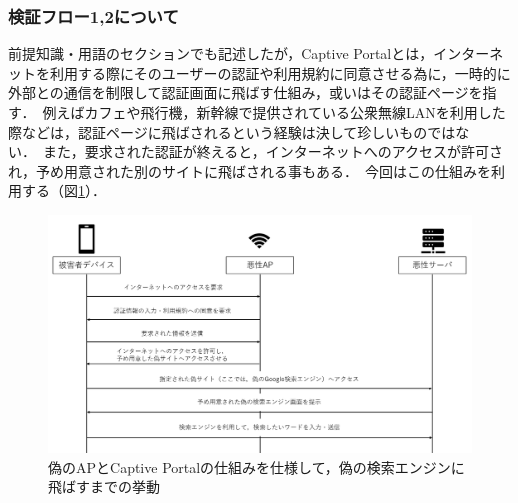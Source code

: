 \documentclass[dvipdfmx]{jsarticle}
\begin{document}
            \subsubsection{検証フロー1,2について}
                前提知識・用語のセクションでも記述したが，Captive Portalとは，インターネットを利用する際にそのユーザーの認証や利用規約に同意させる為に，一時的に外部との通信を制限して認証画面に飛ばす仕組み，或いはその認証ページを指す．\
                例えばカフェや飛行機，新幹線で提供されている公衆無線LANを利用した際などは，認証ページに飛ばされるという経験は決して珍しいものではない．\
                また，要求された認証が終えると，インターネットへのアクセスが許可され，予め用意された別のサイトに飛ばされる事もある．\
                今回はこの仕組みを利用する（図\ref{flow-no12}）．\
                \begin{figure}[pth]
                    \centering
                    \includegraphics[width=15cm]{img/vc-vf-1-2.png}
                    \caption{偽のAPとCaptive Portalの仕組みを仕様して，偽の検索エンジンに飛ばすまでの挙動}
                    \label{flow-no12}
                \end{figure}
                \clearpage
\end{document}
